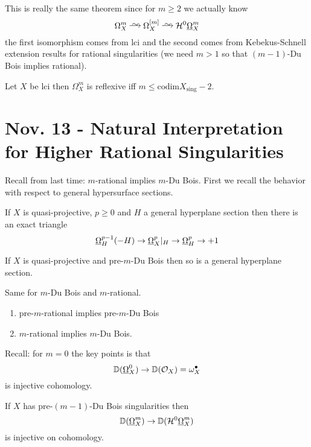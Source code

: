 \documentclass[12pt]{article}
\renewcommand{\cH}{\mathcal{H}}
\renewcommand{\codim}{\mathrm{codim}}
\begin{document}
\begin{rmk}
This is really the same theorem since for $m \ge 2$ we actually know
\[ \Omega_X^m \iso \Omega_X^{[m]} \iso \cH^0 \ulO_X^m \]
the first isomorphism comes from lci and the second comes from Kebekus-Schnell extension results for rational singularities (we need $m > 1$ so that $(m-1)$-Du Bois implies rational). 
\end{rmk}

\begin{theorem}
Let $X$ be lci then $\Omega_X^m$ is reflexive iff $m \le \codim{X_{\text{sing}}} - 2$. 
\end{theorem}

\section{Nov. 13 - Natural Interpretation for Higher Rational Singularities}

Recall from last time: $m$-rational implies $m$-Du Bois. First we recall the behavior with respect to general hypersurface sections.

\begin{prop}
If $X$ is quasi-projective, $p \ge 0$ and $H$ a general hyperplane section then there is an exact triangle
\[ \underline{\Omega}_H^{p-1}(-H) \to \underline{\Omega}_X^p|_H \to \underline{\Omega}_H^p \to + 1 \]
\end{prop}

\begin{theorem}
If $X$ is quasi-projective and pre-$m$-Du Bois then so is a general hyperplane section.
\end{theorem}

\begin{cor}
Same for $m$-Du Bois and $m$-rational.
\end{cor}

\begin{theorem}
\begin{enumerate}
\item pre-$m$-rational implies pre-$m$-Du Bois
\item $m$-rational implies $m$-Du Bois.
\end{enumerate}
\end{theorem}

Recall: for $m = 0$ the key points is that
\[ \mathbb{D}(\underline{\Omega}_X^0) \to \mathbb{D}(\mathcal{O}_{X}) = \omega_X^\bullet \]
is injective cohomology. 

\begin{conj}
If $X$ has pre-$(m-1)$-Du Bois singularities then 
\[ \DD(\ulO_X^m) \to \DD(\cH^0 \ulO_X^m) \]
is injective on cohomology. 
\end{conj}
\end{document}
